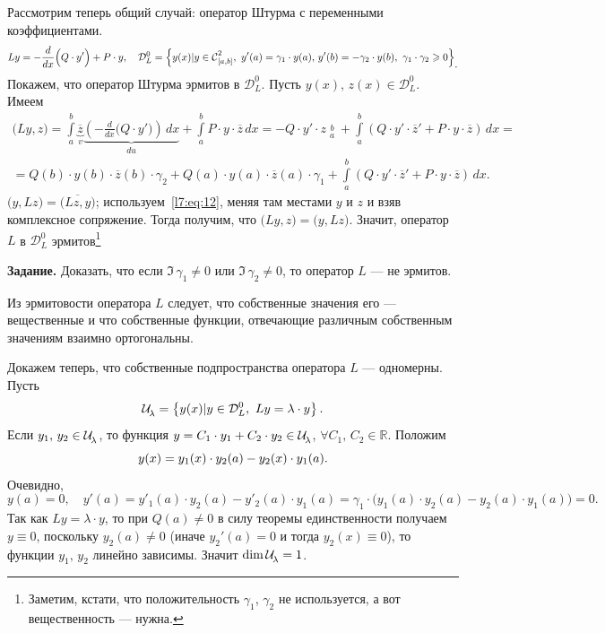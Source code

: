\documentclass[12pt,a4paper,openany,fleqn]{book}
\newcommand{\Cf}{\ensuremath{\mathcal{C}}}
\newcommand{\mc}[1]{\ensuremath{\mathcal{#1}}}
\newcommand{\Cfn}[2][]{\ensuremath{\Cf{\mathstrut}^{#2}_{#1}}}
\newcommand{\der}[2]{\ensuremath{\frac{d#1}{d#2}}}
\newcommand{\Ul}[1][\lambda]{\ensuremath{\mc{U}\!{\mathstrut}_{#1}}}
\theoremstyle{definition}
\begin{document}
	Рассмотрим теперь общий случай: оператор Штурма с переменными коэффициентами.
	\begin{equation*}
		Ly=-\der{}{x}\Big(Q\cdot y'\Big)+P\cdot y,\quad\mc{D}_{L}^{0}=\left\{y(x)|y\in\Cfn[{[a,b]}]{2},\ y'(a)=\gamma_1\cdot y(a),\,y'(b)=-\gamma_2\cdot y(b),\ \gamma_1\cdot\gamma_2\geqslant0\right\}_{\displaystyle.}
	\end{equation*}
	Покажем, что оператор Штурма эрмитов в $\mc{D}_{L}^{0}$. Пусть $y(x),\,z(x)\in\mc{D}_{L}^{0}$. Имеем 
	\begin{multline}
		\label{l7:eq:12}
		\big(Ly,z\big)=\int\limits_a^b\underbrace{\overline{z}}_{v}\underbrace{\left(-\der{}{x}\Big(Q\cdot y'\Big)\right)\,dx}_{du}+\int\limits_a^b P\cdot y\cdot\overline{z}\,dx=-Q\cdot y'\cdot z\mathop{\Big|}\limits_a^b+\int\limits_a^b\left(Q\cdot y'\cdot\overline{z}'+P\cdot y\cdot\overline{z}\right)\,dx=\\
		=Q(b)\cdot y(b)\cdot\overline{z}(b)\cdot\gamma_2+Q(a)\cdot y(a)\cdot\overline{z}(a)\cdot\gamma_1+\int\limits_a^b\left(Q\cdot y'\cdot\overline{z}'+P\cdot y\cdot\overline{z}\right)\,dx.
	\end{multline}
	$\big(y,Lz\big)=\overline{\big(Lz,y\big)}$; используем~\eqref{l7:eq:12}, меняя там местами $y$ и $z$ и взяв комплексное сопряжение. Тогда получим, что $\big(Ly,z\big)=\big(y,Lz\big)$. Значит, оператор $L$ в $\mc{D}_{L}^{0}$ эрмитов\footnote{Заметим, кстати, что положительность $\gamma_1$, $\gamma_2$ не используется, а вот вещественность --- нужна.}
	\vspace{0.2cm}
	
	\noindent\textbf{Задание.} Доказать, что если $\Im\,\gamma_1\neq0$ или $\Im\,\gamma_2\neq0$, то оператор $L$ --- не эрмитов.
	\vspace{0.2cm}
	
	Из эрмитовости оператора $L$ следует, что собственные значения его --- вещественные и что собственные функции, отвечающие различным собственным значениям взаимно ортогональны.
	
	Докажем теперь, что собственные подпространства оператора $L$ --- одномерны. Пусть
	\begin{equation*}
		\hfill\Ul=\left\{y(x)|y\in\mc{D}_L^0,\ Ly=\lambda\cdot y\right\}.\hfill
	\end{equation*}    
	Если $y_1,\,y_2\in\Ul$, то функция $y=C_1\cdot y_1+C_2\cdot y_2\in\Ul$, $\forall C_1,\,C_2\in\mathbb{R}$. Положим
	\begin{equation*}
		\hfill y(x)=y_1(x)\cdot y_2(a)-y_2(x)\cdot y_1(a).\hfill
	\end{equation*}
	Очевидно,
	\begin{equation*}
		y(a)=0,\quad y'(a)=y'_1(a)\cdot y_2(a)-y'_2(a)\cdot y_1(a)=\gamma_1\cdot\big(y_1(a)\cdot y_2(a)-y_2(a)\cdot y_1(a)\big)=0.
	\end{equation*} 
	Так как $Ly=\lambda\cdot y$, то при $Q(a)\neq0$ в силу теоремы единственности получаем $y\equiv0$, поскольку $y_2(a)\neq0$ (иначе $y_2'(a)=0$ и тогда $y_2(x)\equiv0$), то функции $y_1,\,y_2$ линейно зависимы. Значит $\dim\Ul=1$.
	
\end{document}
